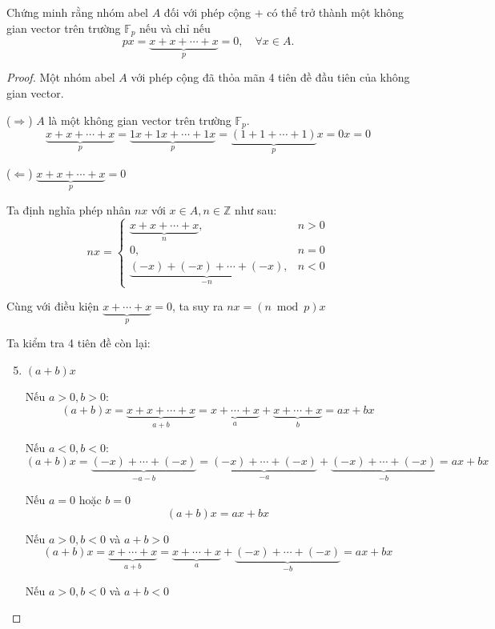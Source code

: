 \documentclass[class=linearalgebra,crop=false]{standalone}
\begin{document}
\begin{exercise}Chứng minh rằng nhóm abel $A$ đối với phép cộng $+$ có thể trở thành một không gian vector trên trường $\mathbb{F}_{p}$ nếu và chỉ nếu
    \[ px = \underbrace{x + x + \cdots + x}_{p} = 0,\quad \forall x\in A. \]
\end{exercise}

\begin{proof}Một nhóm abel $A$ với phép cộng đã thỏa mãn 4 tiên đề đầu tiên của không gian vector.
    \par($\Rightarrow$) $A$ là một không gian vector trên trường $\mathbb{F}_{p}$.
        \[ \underbrace{x + x + \cdots + x}_{p} = \underbrace{1x + 1x + \cdots + 1x}_{p} = \underbrace{(1 + 1 + \cdots + 1)}_{p}x = 0x = 0 \]
    \par($\Leftarrow$) $\underbrace{x + x + \cdots + x}_{p} = 0$
    \par Ta định nghĩa phép nhân $nx$ với $x\in A, n\in\mathbb{Z}$ như sau:
    \[
        nx =
        \begin{cases}
            \underbrace{x + x + \cdots + x}_{n}, & n > 0 \\
            0, & n = 0 \\
            \underbrace{(-x) + (-x) + \cdots + (-x)}_{-n}, & n < 0
        \end{cases}
    \]
    \par Cùng với điều kiện $\underbrace{x + \cdots + x}_{p} = 0$, ta suy ra $nx = (n\bmod{p})x$
    \par Ta kiểm tra 4 tiên đề còn lại:
    \begin{enumerate}[label= (V\arabic*)]
        \setcounter{enumi}{4}
        \item $(a + b)x$
            \par Nếu $a > 0, b > 0$:
            \[ (a + b)x = \underbrace{x + x + \cdots + x}_{a+b} = \underbrace{x + \cdots + x}_{a} + \underbrace{x + \cdots + x}_{b} = ax + bx \]
            \par Nếu $a < 0, b < 0$:
            \[ (a + b)x = \underbrace{(-x) + \cdots + (-x)}_{-a-b} = \underbrace{(-x) + \cdots + (-x)}_{-a} + \underbrace{(-x) + \cdots + (-x)}_{-b} = ax + bx \]
            \par Nếu $a = 0$ hoặc $b = 0$
            \[ (a + b)x = ax + bx \]
            \par Nếu $a > 0, b < 0$ và $a + b > 0$
            \[ (a + b)x = \underbrace{x + \cdots + x}_{a+b} = \underbrace{x + \cdots + x}_{a} + \underbrace{(-x) + \cdots + (-x)}_{-b} = ax + bx \]
            \par Nếu $a > 0, b < 0$ và $a + b < 0$

\end{enumerate}
\end{proof}
\end{document}
